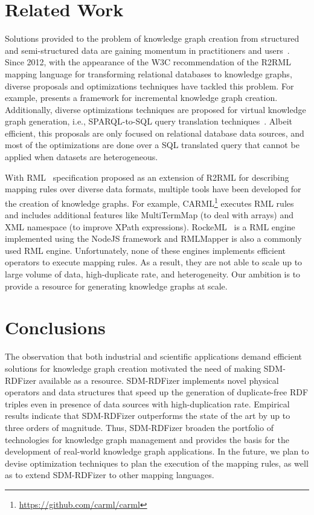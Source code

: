 \section{Related Work}
\label{sec:rw}
Solutions provided to the problem of knowledge graph creation from structured and semi-structured data are gaining momentum in practitioners and users~\citep{corcho2020towards}. Since 2012, with the appearance of the W3C recommendation of the R2RML~\citep{das2012r2rml} mapping language for transforming relational databases to knowledge graphs, diverse proposals and optimizations techniques have tackled this problem. For example, \citep{gawriljuk2016scalable} presents a framework for incremental knowledge graph creation. Additionally, diverse optimizations techniques are proposed for virtual knowledge graph generation\citep{calvanese2017ontop,PriyatnaCS14}, i.e., SPARQL-to-SQL query translation techniques~\citep{chebotko2009semantics}. Albeit efficient, this proposals are only focused on relational database data sources, and most of the optimizations are done over a SQL translated query that cannot be applied when datasets are heterogeneous.

With RML~\citep{DimouSCVMW14} specification proposed as an extension of R2RML for describing mapping rules over diverse data formats, multiple tools have been developed for the creation of knowledge graphs. For example, CARML\footnote{\url{https://github.com/carml/carml}} executes RML rules and includes additional features like MultiTermMap (to deal with arrays) and XML namespace (to improve XPath expressions). RockeML~\citep{csimcsek2019rocketrml} is a RML engine implemented using the NodeJS framework and RMLMapper is also a commonly used RML engine. Unfortunately, none of these engines implements efficient operators to execute mapping rules. As a result, they are not able to scale up to large volume of data, high-duplicate rate, and heterogeneity. Our ambition is to provide a resource for generating knowledge graphs at scale.

\section{Conclusions}
\label{sec:conclusion}
The observation that both industrial and scientific applications demand efficient solutions for knowledge graph creation motivated the need of making SDM-RDFizer available as a resource. SDM-RDFizer implements novel physical operators and data structures that speed up the generation of duplicate-free RDF triples even in presence of data sources with high-duplication rate. Empirical results indicate that SDM-RDFizer outperforms the state of the art by up to three orders of magnitude. Thus, SDM-RDFizer broaden the portfolio of technologies for knowledge graph management and provides the basis for the development of real-world knowledge graph applications. In the future, we plan to devise optimization techniques to plan the execution of the mapping rules, as well as to extend SDM-RDFizer to other mapping languages.